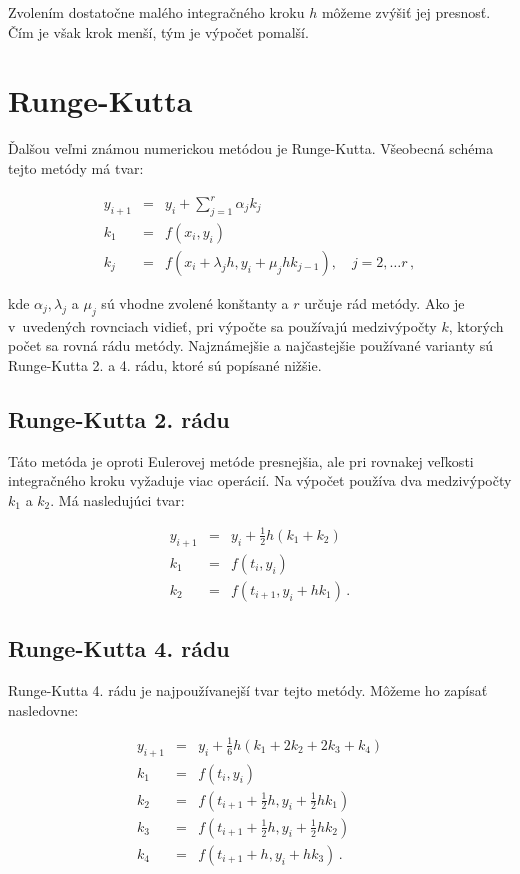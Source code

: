Zvolením dostatočne malého integračného kroku $ h $ môžeme zvýšiť jej presnosť. Čím je však krok menší, tým je výpočet pomalší.


\section{Runge-Kutta}
Ďalšou veľmi známou numerickou metódou je Runge-Kutta. Všeobecná schéma tejto metódy má tvar:

\begin{eqnarray}
y_{i+1} & = & y_{i} + \sum^{r}_{j=1} \alpha_{j}k_{j} \\
k_{1} & = & f(x_{i},y_{i}) \nonumber \\
k_{j} & = & f(x_{i} + \lambda_{j}h, y_{i} + \mu_{j}hk_{j-1}) , \quad j=2,\dotsc r \, , \nonumber
\end{eqnarray}

kde $\alpha_{j}, \lambda_{j}$ a $\mu_{j}$ sú vhodne zvolené konštanty a $ r $ určuje rád metódy. Ako je v~uvedených rovnciach vidieť, pri výpočte sa používajú medzivýpočty $ k $, ktorých počet sa rovná rádu metódy.
Najznámejšie a najčastejšie používané varianty sú Runge-Kutta 2. a 4. rádu, ktoré sú popísané nižšie.

\newpage
\subsection{Runge-Kutta 2. rádu} \label{RK2}
Táto metóda je oproti Eulerovej metóde presnejšia, ale pri rovnakej veľkosti integračného kroku vyžaduje viac operácií. Na výpočet používa dva medzivýpočty $ k_{1} $ a $ k_{2} $. Má nasledujúci tvar:

\begin{eqnarray}
y_{i+1} & = & y_{i} + \frac{1}{2}h(k_{1} + k_{2}) \\
k_{1} & = & f(t_{i},y_{i}) \nonumber \\
k_{2} & = & f(t_{i+1}, y_{i} + hk_{1}) \, . \nonumber
\end{eqnarray}


\subsection{Runge-Kutta 4. rádu} \label{RK4}
Runge-Kutta 4. rádu je najpoužívanejší tvar tejto metódy. Môžeme ho zapísať nasledovne:

\begin{eqnarray}
y_{i+1} & = & y_{i} + \frac{1}{6}h(k_{1} + 2k_{2} + 2k_{3} + k_{4}) \\
k_{1} & = & f(t_{i},y_{i}) \nonumber \\
k_{2} & = & f(t_{i+1} + \frac{1}{2}h, y_{i} + \frac{1}{2}hk_{1}) \nonumber \\
k_{3} & = & f(t_{i+1} + \frac{1}{2}h, y_{i} + \frac{1}{2}hk_{2}) \nonumber \\
k_{4} & = & f(t_{i+1} + h, y_{i} + hk_{3}) \, . \nonumber
\end{eqnarray}

